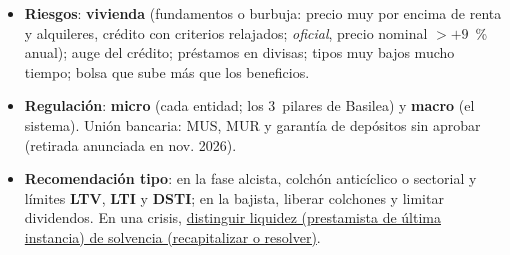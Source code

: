\documentclass{article}
\begin{document}
\begin{columnas}
\begin{itemize}[itemsep=1.5pt]
\item \textbf{Riesgos}: \textbf{vivienda} (fundamentos o burbuja: precio muy por encima de renta y alquileres, crédito con criterios relajados; \emph{oficial}, precio nominal $>+9$~\% anual); auge del crédito; préstamos en divisas; tipos muy bajos mucho tiempo; bolsa que sube más que los beneficios.
\item \textbf{Regulación}: \textbf{micro} (cada entidad; los 3~pilares de Basilea) y \textbf{macro} (el sistema). Unión bancaria: MUS, MUR y garantía de depósitos sin aprobar (retirada anunciada en nov. 2026).
\item \textbf{Recomendación tipo}: en la fase alcista, colchón anticíclico o sectorial y límites \textbf{LTV}, \textbf{LTI} y \textbf{DSTI}; en la bajista, liberar colchones y limitar dividendos. En una crisis, \uline{distinguir liquidez (prestamista de última instancia) de solvencia (recapitalizar o resolver)}.
\end{itemize}


\end{columnas}
\end{document}
